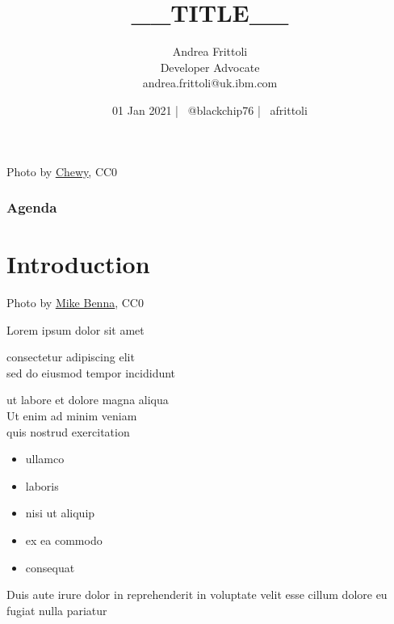 \documentclass[aspectratio=169,11pt,hyperref={colorlinks=true}]{beamer}
\title{__TITLE__}
\date[01 Jan 2021]{01 Jan 2021 | \faTwitter ~@blackchip76 | \faGithub ~afrittoli}
\author[Andrea Frittoli]{%
  Andrea Frittoli \\
  Developer Advocate \\
  andrea.frittoli@uk.ibm.com \\
}
\begin{document}
\begin{frame}
\titlepage{}
\end{frame}

\begin{lpicrblack}{%
  Photo by \href{https://unsplash.com/@chewy}{\underline{Chewy}}, CC0
  }%
  {%
  \tableofcontents
  }%
  {}
  \frametitle{Agenda}
\end{lpicrblack}

\section[Introduction]{Introduction}

\begin{sectionwithpic}{Photo by \href{https://unsplash.com/@mbenna}{\underline{Mike Benna}}, CC0}
\end{sectionwithpic}

\begin{stripedframe}%
  {%
  Lorem ipsum dolor sit amet
  }%
  {%
  consectetur adipiscing elit \\
  \vspace{0.03\textheight}
  sed do eiusmod tempor incididunt \\
  \vspace{0.1\textheight}
  \centering
  
  }%
  {%
  ut labore et dolore magna aliqua \\
  \vspace{0.03\textheight}
  Ut enim ad minim veniam \\
  \vspace{0.03\textheight}
  quis nostrud exercitation
  }%
  {%
  \begin{itemize}
    \item ullamco
    \item laboris
  \end{itemize}
  \vspace{0.01\textheight}
  \begin{itemize}
    \item nisi ut aliquip
    \item ex ea commodo
    \item consequat
  \end{itemize}
  }%
  {%
  Duis aute irure dolor in reprehenderit in voluptate velit esse cillum dolore eu fugiat nulla pariatur
  }%
\end{stripedframe}
\end{document}
